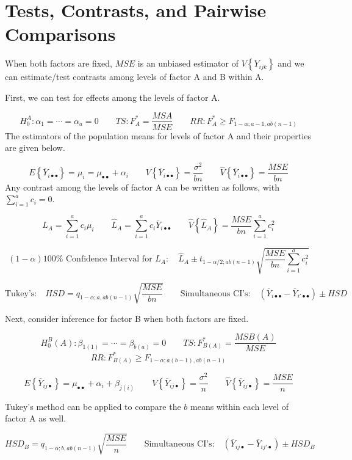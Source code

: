 \documentclass[
]{book}
\begin{document}
\section{Tests, Contrasts, and Pairwise
Comparisons}\label{tests-contrasts-and-pairwise-comparisons}

When both factors are fixed, \(MSE\) is an unbiased estimator of
\(V\left\{Y_{ijk}\right\}\) and we can estimate/test contrasts among
levels of factor A and B within A.

First, we can test for effects among the levels of factor A.

\[
H_0^A: \alpha_1=\cdots = \alpha_a=0 \qquad
TS: F_A^*=\frac{MSA}{MSE}   \qquad
RR: F_A^* \geq F_{1-\alpha;a-1,ab(n-1)}
\] The estimators of the population means for levels of factor A and
their properties are given below.

\[
E\left\{\overline{Y}_{i\bullet\bullet}\right\}=\mu_i=
\mu_{\bullet\bullet}+\alpha_i   \qquad
V\left\{\overline{Y}_{i\bullet\bullet}\right\}=\frac{\sigma^2}{bn}
\qquad
\hat{V}\left\{\overline{Y}_{i\bullet\bullet}\right\}=\frac{MSE}{bn}
\] Any contrast among the levels of factor A can be written as follows,
with \(\sum_{i=1}^ac_i=0\).

\[
L_A = \sum_{i=1}^ac_i\mu_i \qquad
\hat{L}_A=\sum_{i=1}^ac_i \overline{Y}_{i\bullet\bullet}
\qquad
\hat{V}\left\{\hat{L}_A\right\}=\frac{MSE}{bn}\sum_{i=1}^ac_i^2
\]

\[
(1-\alpha)100\% \mbox{ Confidence Interval for } L_A:
\quad 
\hat{L}_A \pm t_{1-\alpha/2; ab(n-1)}\sqrt{\frac{MSE}{bn}\sum_{i=1}^ac_i^2}
\]

\[
\mbox{Tukey's:} \quad HSD=q_{1-\alpha;a,ab(n-1)}\sqrt{\frac{MSE}{bn}}
\qquad
\mbox{Simultaneous CI's:} \quad
\left(\overline{Y}_{i\bullet\bullet}-\overline{Y}_{i'\bullet\bullet}\right)
\pm HSD
\]

Next, consider inference for factor B when both factors are fixed.

\[
H_0^B(A): \beta_{1(1)}=\cdots = \beta_{b(a)}=0 \qquad
TS: F_{B(A)}^*=\frac{MSB(A)}{MSE}   
\] \[
RR: F_{B(A)}^* \geq F_{1-\alpha;a(b-1),ab(n-1)}
\]

\[
E\left\{\overline{Y}_{ij\bullet}\right\}=
\mu_{\bullet\bullet}+\alpha_i + \beta_{j(i)}  \qquad
V\left\{\overline{Y}_{ij\bullet}\right\}=\frac{\sigma^2}{n}
\qquad
\hat{V}\left\{\overline{Y}_{ij\bullet}\right\}=\frac{MSE}{n}
\]

Tukey's method can be applied to compare the \(b\) means within each
level of factor A as well.

\[
 HSD_B=q_{1-\alpha;b,ab(n-1)}\sqrt{\frac{MSE}{n}}
\qquad
\mbox{Simultaneous CI's:} \quad
\left(\overline{Y}_{ij\bullet}-\overline{Y}_{ij'\bullet}\right)
\pm HSD_B
\]
\end{document}

